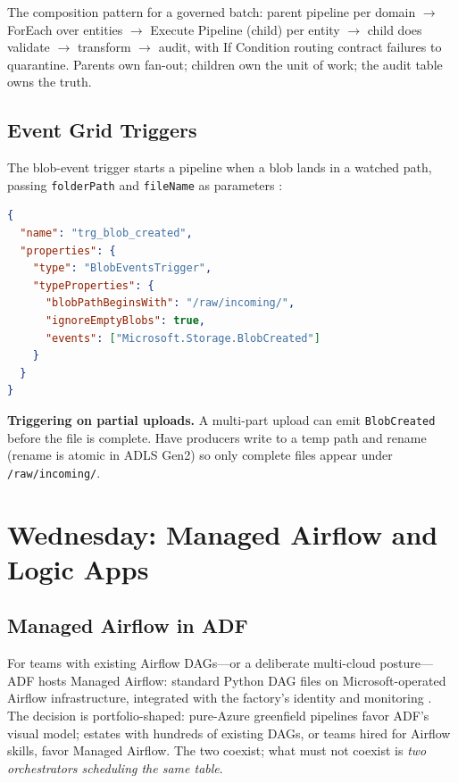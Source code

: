 The composition pattern for a governed batch: parent pipeline per domain $\rightarrow$ ForEach over entities $\rightarrow$ Execute Pipeline (child) per entity $\rightarrow$ child does validate $\rightarrow$ transform $\rightarrow$ audit, with If Condition routing contract failures to quarantine. Parents own fan-out; children own the unit of work; the audit table owns the truth.

\subsection{Event Grid Triggers}
The blob-event trigger starts a pipeline when a blob lands in a watched path, passing \texttt{folderPath} and \texttt{fileName} as parameters \cite{microsoft2025eventGrid}:

\begin{lstlisting}[language=json,caption={Blob-event trigger: fire only on completed uploads to the incoming path.},label={lst:ch12-trigger}]
{
  "name": "trg_blob_created",
  "properties": {
    "type": "BlobEventsTrigger",
    "typeProperties": {
      "blobPathBeginsWith": "/raw/incoming/",
      "ignoreEmptyBlobs": true,
      "events": ["Microsoft.Storage.BlobCreated"]
    }
  }
}
\end{lstlisting}

\begin{pitfall}
\textbf{Triggering on partial uploads.} A multi-part upload can emit \texttt{BlobCreated} before the file is complete. Have producers write to a temp path and rename (rename is atomic in ADLS Gen2) so only complete files appear under \texttt{/raw/incoming/}.
\end{pitfall}

\section{Wednesday: Managed Airflow and Logic Apps}

\subsection{Managed Airflow in ADF}
For teams with existing Airflow DAGs---or a deliberate multi-cloud posture---ADF hosts Managed Airflow: standard Python DAG files on Microsoft-operated Airflow infrastructure, integrated with the factory's identity and monitoring \cite{apache2025airflow}. The decision is portfolio-shaped: pure-Azure greenfield pipelines favor ADF's visual model; estates with hundreds of existing DAGs, or teams hired for Airflow skills, favor Managed Airflow. The two coexist; what must not coexist is \emph{two orchestrators scheduling the same table}.

